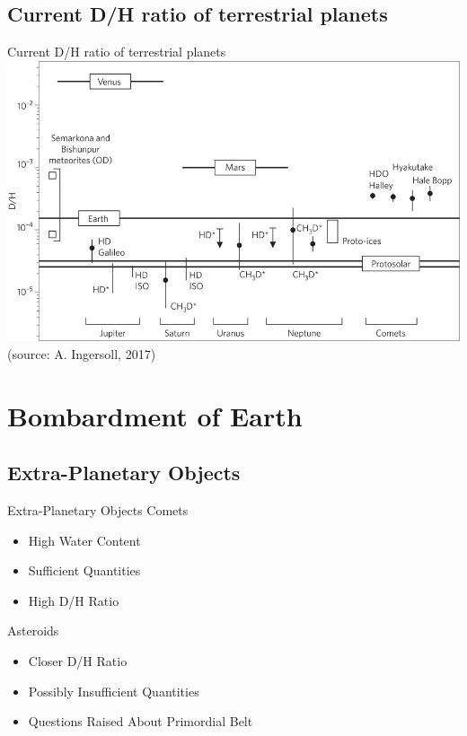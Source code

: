 \documentclass[11pt, aspectratio=169]{beamer}
\begin{document}
\subsection{Current D/H ratio of terrestrial planets}
\begin{frame}[t]{Current D/H ratio of terrestrial planets}
	\centering
	\includegraphics[height=.7\textheight]{figures/dh-ratio-terrestrial-planets.jpg}\\
	\small (source: A. Ingersoll, 2017)
\end{frame}



\section{Bombardment of Earth}
\subsection{Extra-Planetary Objects}
\begin{frame}[t]{Extra-Planetary Objects}
Comets
\begin{itemize}
	\item High Water Content
	\item Sufficient Quantities
	\item High D/H Ratio
\end{itemize}

Asteroids
\begin{itemize}
	\item Closer D/H Ratio
	\item Possibly Insufficient Quantities
	\item Questions Raised About Primordial Belt
\end{itemize}
\end{frame}
\end{document}
